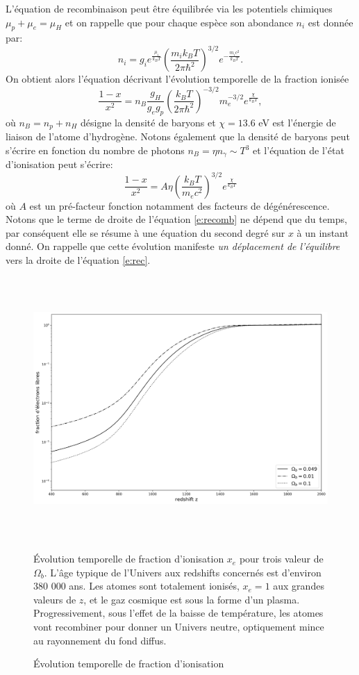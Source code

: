 L'équation de recombinaison peut être équilibrée via les potentiels chimiques $\mu_p+ \mu_e =\mu_H$ et on rappelle que pour chaque espèce son abondance $n_i$ est donnée par:
\begin{equation}
n_i=g_ie^{\frac{\mu_i}{k_BT}}\left(\frac{m_i k_B T}{2\pi\hbar^2}\right)^{3/2}e^{-\frac{m_i c^2}{k_B T}}.
\end{equation}
On obtient alors l'équation décrivant l'évolution temporelle de la fraction ionisée 
\begin{equation}
\frac{1-x}{x^2}=n_B \frac{g_H}{g_e g_p} \left(\frac{k_B T}{2\pi\hbar^2}\right)^{-3/2} m_e^{-3/2} e^{\frac{\chi}{k_B T}},
\end{equation}
où $n_B=n_p + n_H$ désigne la densité de baryons et $\chi=13.6$ eV est l'énergie de liaison de l'atome d'hydrogène. Notons également que la densité de baryons peut s'écrire en fonction du nombre de photons $n_B=\eta n_\gamma\sim T^3$ et l'équation de l'état d'ionisation peut s'écrire:
\begin{equation}
\frac{1-x}{x^2}=A \eta \left(\frac{k_B T}{m_e c^2}\right)^{3/2}e^{\frac{\chi}{k_B T}}
\label{e:recomb}
\end{equation}
où $A$ est un pré-facteur fonction notamment des facteurs de dégénérescence. Notons que le terme de droite de l'équation \ref{e:recomb} ne dépend que du temps, par conséquent elle se résume à une équation du second degré sur $x$ à un instant donné. On rappelle que cette évolution manifeste \textit{un déplacement de l'équilibre} vers  la droite de l'équation \ref{e:rec}.
\begin{figure}[htbp]
	\centering
		\includegraphics[height=10cm]{figs/recom.png}
		\caption{Évolution temporelle de fraction d'ionisation}{Évolution temporelle de fraction d'ionisation $x_e$ pour trois valeur de $\Omega_b$. L'âge typique de l'Univers aux redshifts concernés est d'environ 380 000 ans. Les atomes sont totalement ionisés, $x_e=1$ aux grandes valeurs de $z$, et le gaz cosmique est sous la forme d'un plasma. Progressivement, sous l'effet de la baisse de température, les atomes vont recombiner pour donner un Univers neutre, optiquement mince au rayonnement du fond diffus.}
	\label{f:recomb}
\end{figure}

